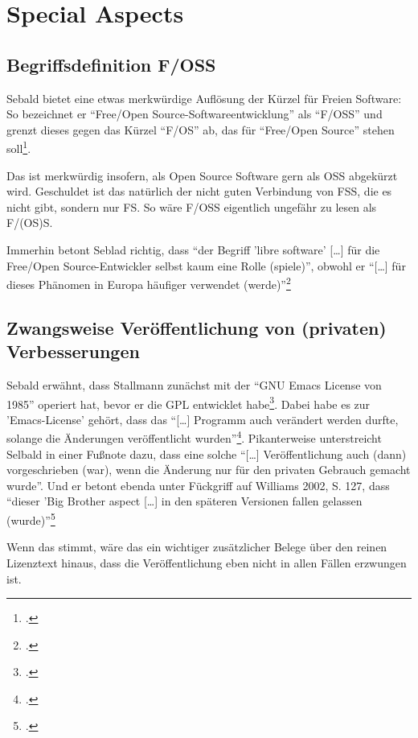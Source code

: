 \documentclass[DIV=calc,BCOR=5mm,11pt,headings=small,oneside,abstract=true, toc=bib]{scrartcl}
\begin{document}
\section{Special Aspects}

\subsection{Begriffsdefinition F/OSS}

Sebald bietet eine etwas merkwürdige Auflösung der Kürzel für Freien Software:
So bezeichnet er \enquote{Free/Open Source-Softwareentwicklung} als
\enquote{F/OSS} und grenzt dieses gegen das Kürzel \enquote{F/OS} ab,
das für \enquote{Free/Open Source} stehen
soll\footcite[vgl.][15]{Sebald2008a}. 

Das ist merkwürdig insofern, als Open Source Software gern als OSS abgekürzt
wird. Geschuldet ist das natürlich der nicht guten Verbindung von FSS, die es
nicht gibt, sondern nur FS. So wäre F/OSS eigentlich ungefähr zu lesen als
F/(OS)S.

Immerhin betont Seblad richtig, dass \enquote{der Begriff 'libre software'
[\ldots]  für die Free/Open Source-Entwickler selbst kaum eine Rolle
(spiele)}, obwohl er \enquote{[\ldots] für dieses Phänomen in Europa
häufiger verwendet (werde)}\footcite[vgl.][15, Anm.7]{Sebald2008a}

\subsection{Zwangsweise Veröffentlichung von (privaten) Verbesserungen}

Sebald erwähnt, dass Stallmann zunächst mit der \enquote{GNU Emacs License
von 1985} operiert hat, bevor er die GPL entwicklet
habe\footcite[vgl.][76]{Sebald2008a}. Dabei habe es zur 'Emacs-License' gehört,
dass das \enquote{[\ldots] Programm auch verändert werden durfte, solange
die Änderungen veröffentlicht wurden}\footcite[vgl.][76]{Sebald2008a}.
Pikanterweise unterstreicht Selbald in einer Fußnote dazu, dass
eine solche \enquote{[\ldots] Veröffentlichung auch (dann) vorgeschrieben (war),
wenn die Änderung nur für den privaten Gebrauch gemacht wurde}. Und er
betont ebenda unter Fückgriff auf Williams 2002, S. 127, dass
\enquote{dieser 'Big Brother aspect [\ldots] in den späteren Versionen
fallen gelassen (wurde)}\footcite[vgl.][76 Anm. 85]{Sebald2008a}

Wenn das stimmt, wäre das ein wichtiger zusätzlicher Belege über den reinen
Lizenztext hinaus, dass die Veröffentlichung eben nicht in allen Fällen
erzwungen ist.

\small

\end{document}
